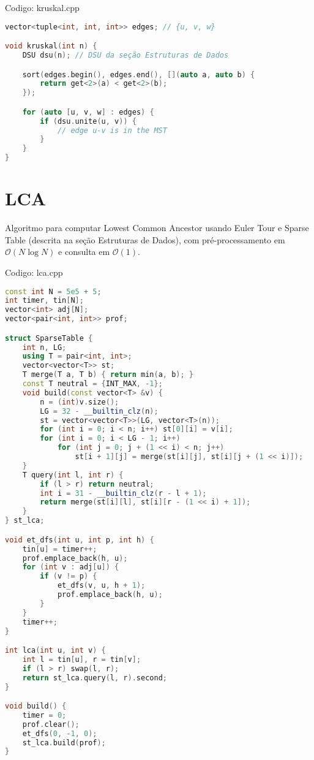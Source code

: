 \documentclass[10pt, a4paper, oneside]{book}
\begin{document}
Codigo: kruskal.cpp

\begin{lstlisting}[language=C++]
vector<tuple<int, int, int>> edges; // {u, v, w}

void kruskal(int n) {
    DSU dsu(n); // DSU da seção Estruturas de Dados

    sort(edges.begin(), edges.end(), [](auto a, auto b) {
        return get<2>(a) < get<2>(b);
    });

    for (auto [u, v, w] : edges) {
        if (dsu.unite(u, v)) {
            // edge u-v is in the MST
        }
    }
}
\end{lstlisting}
\hfill

\section{LCA}


Algoritmo para computar Lowest Common Ancestor usando Euler Tour e Sparse Table (descrita na seção Estruturas de Dados), com pré-processamento em $\mathcal{O}(N \log N)$ e consulta em $\mathcal{O}(1)$.

\hfill

Codigo: lca.cpp

\begin{lstlisting}[language=C++]
const int N = 5e5 + 5;
int timer, tin[N];
vector<int> adj[N];
vector<pair<int, int>> prof;

struct SparseTable {
    int n, LG;
    using T = pair<int, int>;
    vector<vector<T>> st;
    T merge(T a, T b) { return min(a, b); }
    const T neutral = {INT_MAX, -1};
    void build(const vector<T> &v) {
        n = (int)v.size();
        LG = 32 - __builtin_clz(n);
        st = vector<vector<T>>(LG, vector<T>(n));
        for (int i = 0; i < n; i++) st[0][i] = v[i];
        for (int i = 0; i < LG - 1; i++)
            for (int j = 0; j + (1 << i) < n; j++)
                st[i + 1][j] = merge(st[i][j], st[i][j + (1 << i)]);
    }
    T query(int l, int r) {
        if (l > r) return neutral;
        int i = 31 - __builtin_clz(r - l + 1);
        return merge(st[i][l], st[i][r - (1 << i) + 1]);
    }
} st_lca;

void et_dfs(int u, int p, int h) {
    tin[u] = timer++;
    prof.emplace_back(h, u);
    for (int v : adj[u]) {
        if (v != p) {
            et_dfs(v, u, h + 1);
            prof.emplace_back(h, u);
        }
    }
    timer++;
}

int lca(int u, int v) {
    int l = tin[u], r = tin[v];
    if (l > r) swap(l, r);
    return st_lca.query(l, r).second;
}

void build() {
    timer = 0;
    prof.clear();
    et_dfs(0, -1, 0);
    st_lca.build(prof);
}\end{lstlisting}
\hfill
\end{document}
